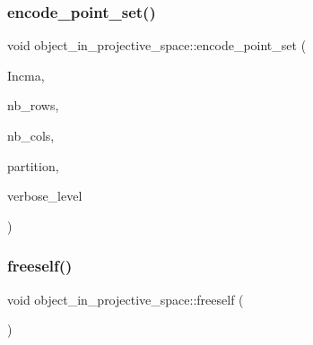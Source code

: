\subsubsection{\texorpdfstring{encode\+\_\+point\+\_\+set()}{encode\_point\_set()}}
{\footnotesize\ttfamily void object\+\_\+in\+\_\+projective\+\_\+space\+::encode\+\_\+point\+\_\+set (\begin{DoxyParamCaption}\item[{\mbox{\hyperlink{galois_8h_a09fddde158a3a20bd2dcadb609de11dc}{I\+NT}} $\ast$\&}]{Incma,  }\item[{\mbox{\hyperlink{galois_8h_a09fddde158a3a20bd2dcadb609de11dc}{I\+NT}} \&}]{nb\+\_\+rows,  }\item[{\mbox{\hyperlink{galois_8h_a09fddde158a3a20bd2dcadb609de11dc}{I\+NT}} \&}]{nb\+\_\+cols,  }\item[{\mbox{\hyperlink{galois_8h_a09fddde158a3a20bd2dcadb609de11dc}{I\+NT}} $\ast$\&}]{partition,  }\item[{\mbox{\hyperlink{galois_8h_a09fddde158a3a20bd2dcadb609de11dc}{I\+NT}}}]{verbose\+\_\+level }\end{DoxyParamCaption})}

\mbox{\label{classobject__in__projective__space_a371bc4c5e7744127cc8b75fad5903ac1}} 
\subsubsection{\texorpdfstring{freeself()}{freeself()}}
{\footnotesize\ttfamily void object\+\_\+in\+\_\+projective\+\_\+space\+::freeself (\begin{DoxyParamCaption}{ }\end{DoxyParamCaption})}

\mbox{\label{classobject__in__projective__space_a910badf3915797f5a3c57e981231bed2}} 
